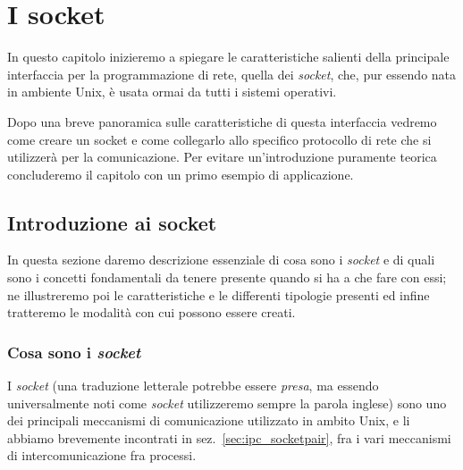 
\chapter{I socket}
\label{cha:socket_intro}

In questo capitolo inizieremo a spiegare le caratteristiche salienti della
principale interfaccia per la programmazione di rete, quella dei
\textit{socket}, che, pur essendo nata in ambiente Unix, è usata ormai da
tutti i sistemi operativi.

Dopo una breve panoramica sulle caratteristiche di questa interfaccia vedremo
come creare un socket e come collegarlo allo specifico protocollo di rete che
si utilizzerà per la comunicazione. Per evitare un'introduzione puramente
teorica concluderemo il capitolo con un primo esempio di applicazione.

\section{Introduzione ai socket}
\label{sec:sock_overview}

In questa sezione daremo descrizione essenziale di cosa sono i \textit{socket}
e di quali sono i concetti fondamentali da tenere presente quando si ha a che
fare con essi; ne illustreremo poi le caratteristiche e le differenti
tipologie presenti ed infine tratteremo le modalità con cui possono essere
creati.


\subsection{Cosa sono i \textit{socket}}
\label{sec:sock_socket_def}

I \textit{socket} (una traduzione letterale potrebbe essere \textsl{presa}, ma
essendo universalmente noti come \textit{socket} utilizzeremo sempre la parola
inglese) sono uno dei principali meccanismi di comunicazione utilizzato in
ambito Unix, e li abbiamo brevemente incontrati in
sez.~\ref{sec:ipc_socketpair}, fra i vari meccanismi di intercomunicazione fra
processi. 

